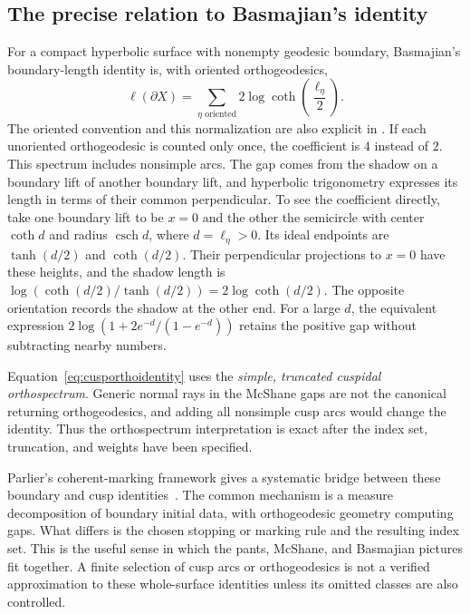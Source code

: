 \subsection{The precise relation to Basmajian's identity}

For a compact hyperbolic surface with nonempty geodesic boundary,
Basmajian's boundary-length identity is, with oriented orthogeodesics,
\begin{equation}
 \ell(\partial X)=
 \sum_{\eta\text{ oriented}}2\log\coth\left(\frac{\ell_\eta}{2}\right).
 \label{eq:basmajian}
\end{equation}
The oriented convention and this normalization are also explicit in
\cite[Section 4.2, p.~26]{Parlier}.
If each unoriented orthogeodesic is counted only once, the coefficient is
$4$ instead of $2$. This spectrum includes nonsimple arcs. The gap comes
from the shadow on a boundary lift of another boundary lift, and
hyperbolic trigonometry expresses its length in terms of their common
perpendicular. To see the coefficient directly, take one boundary lift
to be $x=0$ and the other the semicircle with center $\coth d$ and
radius $\operatorname{csch}d$, where $d=\ell_\eta>0$. Its ideal endpoints
are $\tanh(d/2)$ and $\coth(d/2)$. Their perpendicular projections to
$x=0$ have these heights, and the shadow length is
$\log(\coth(d/2)/\tanh(d/2))=2\log\coth(d/2)$.
The opposite orientation records the shadow at the other end. For a
large $d$, the equivalent expression
$2\log(1+2e^{-d}/(1-e^{-d}))$ retains the positive gap without subtracting
nearby numbers.

Equation~\eqref{eq:cusporthoidentity} uses the \emph{simple, truncated
cuspidal orthospectrum}. Generic normal rays in the McShane gaps are not
the canonical returning orthogeodesics, and adding all nonsimple cusp arcs
would change the identity. Thus the orthospectrum interpretation is exact
after the index set, truncation, and weights have been specified.

Parlier's coherent-marking framework gives a systematic bridge between
these boundary and cusp identities~\cite{Parlier}. The common mechanism
is a measure decomposition of boundary initial data, with orthogeodesic
geometry computing gaps. What differs is the chosen stopping or marking
rule and the resulting index set. This is the useful sense in which the
pants, McShane, and Basmajian pictures fit together. A finite selection
of cusp arcs or orthogeodesics is not a verified approximation to these
whole-surface identities unless its omitted classes are also controlled.
